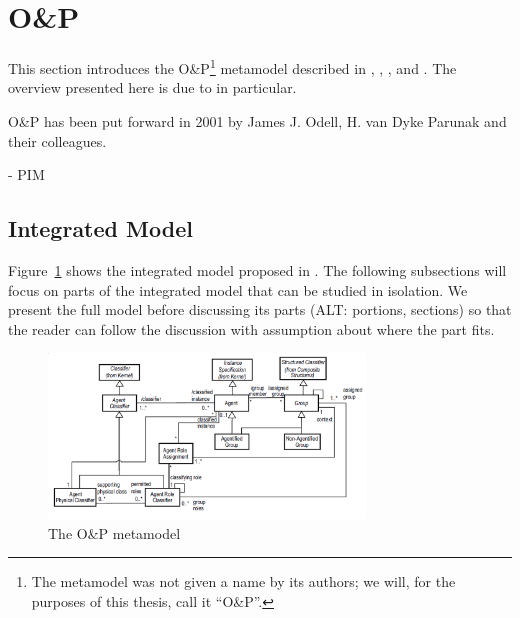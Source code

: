 \section{O\&P}

This section introduces the O&P\footnote{The metamodel was not given a name by its authors; we will, for the purposes of this thesis, call it ``O\&P''.} metamodel described in \cite{Odell01}, \cite{Parunak02}, \cite{Odell03b}, \cite{Odell04b} and \cite{Odell05}.
The overview presented here is due to \cite{Odell05} in particular.

O&P has been put forward in 2001 by James J. Odell, H. van Dyke Parunak and their colleagues.


- PIM

\subsection{Integrated Model}

Figure~\ref{figure:onp-metamodel} shows the integrated model proposed in \cite{Odell05}.
The following subsections will focus on parts of the integrated model that can be studied in isolation.
We present the full model before discussing its parts (ALT: portions, sections) so that the reader can follow the discussion with assumption about where the part fits.

\begin{figure}[ht]
	\centering
	\includegraphics[width=0.75\textwidth]{images/onp-metamodel.png}
	\caption{The O\&P metamodel}
	\label{figure:onp-metamodel}
\end{figure}

